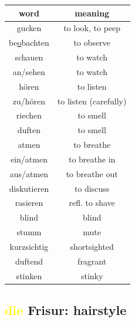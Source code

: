 \begin{center}
    \begin{tabular}{|c|c|}
        \hline
        \rowcolor{gray}
        word                   & meaning               \\
        \hline
        gucken                 & to look, to peep      \\
        be\underline{o}bachten & to observe            \\
        schauen                & to watch              \\
        an/sehen               & to watch              \\
        \hline
        hören                  & to listen             \\
        zu/hören               & to listen (carefully) \\
        \hline
        riechen                & to smell              \\
        duften                 & to smell              \\
        \hline
        atmen                  & to breathe            \\
        ein/atmen              & to breathe in         \\
        aus/atmen              & to breathe out        \\
        diskutieren            & to discuss            \\
        \hline
        rasieren               & refl. to shave        \\
        \hline
        blind                  & blind                 \\
        stumm                  & mute                  \\
        kurzsichtig            & shortsighted          \\
        duftend                & fragrant              \\
        stinken                & stinky                \\
        \hline
    \end{tabular}
\end{center}

\subsection{\textcolor{yellow}{die} Frisur: hairstyle}

